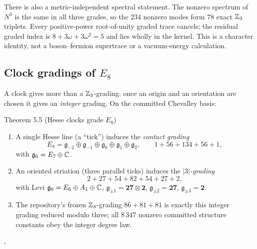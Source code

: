 There is also a metric-independent spectral statement. The nonzero spectrum of $N^3$ is
the same in all three grades, so the $234$ nonzero modes form $78$ exact $\mathbb{Z}_3$ triplets.
Every positive-power root-of-unity graded trace cancels; the residual graded index is
$8+3\omega+3\omega^2=5$ and lies wholly in the kernel. This is a character identity,
not a boson--fermion supertrace or a vacuum-energy calculation.

\subsection{Clock gradings of \texorpdfstring{$E_8$}{E8}}

A clock gives more than a $\mathbb{Z}_3$-grading: once an origin and an orientation are chosen it
gives an \emph{integer} grading. On the committed Chevalley basis:

\begin{result}{Theorem 5.5 (Hesse clocks grade $E_8$) \hfill \tierC}
\begin{enumerate}[label=(\roman*),leftmargin=1.5em]
\item A single Hesse line (a ``tick'') induces the \emph{contact grading}
      \[ E_8=\mathfrak g_{-2}\oplus\mathfrak g_{-1}\oplus\mathfrak g_0\oplus\mathfrak g_1\oplus\mathfrak g_2,\qquad 1+56+134+56+1, \]
      with $\mathfrak g_0=E_7\oplus\mathbb{C}$.
\item An oriented striation (three parallel ticks) induces the \emph{$|3|$-grading}
      \[ 2+27+54+82+54+27+2, \]
      with Levi $\mathfrak g_0=E_6\oplus A_1\oplus\mathbb{C}$, $\mathfrak g_{\pm1}=\mathbf{27}\otimes\mathbf2$,
      $\mathfrak g_{\pm2}=\mathbf{27}$, $\mathfrak g_{\pm3}=\mathbf2$.
\item The repository's frozen $\mathbb{Z}_3$-grading $86+81+81$ is exactly this integer grading
      reduced modulo three; all $8\,347$ nonzero committed structure constants obey the
      integer degree law.
\end{enumerate}
,
\end{result}


